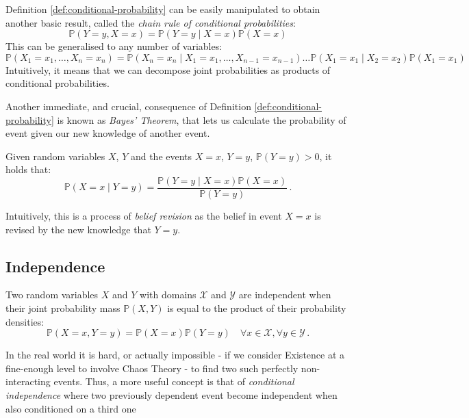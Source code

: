 Definition \ref{def:conditional-probability} can be easily manipulated to obtain another basic result, called the \textit{chain rule of conditional probabilities}:
\begin{equation} \label{eq:chainrule}
	\mathbb{P}(Y=y,X=x) = \mathbb{P}(Y=y \mid X=x) \mathbb{P}(X=x)
\end{equation}
This can be generalised to any number of variables:
\begin{equation} \label{eq:chainrule}
	\mathbb{P}(X_1=x_1, \ldots , X_n=x_n ) = \mathbb{P}(X_n=x_n \mid X_1=x_1, \ldots, X_{n-1}=x_{n-1}) \ldots \mathbb{P}(X_1=x_1 \mid X_2=x_2 ) \mathbb{P}(X_1=x_1) 
\end{equation}
Intuitively, it means that we can decompose joint probabilities as products of conditional probabilities.  

Another immediate, and crucial, consequence of Definition \ref{def:conditional-probability} is known as \textit{Bayes' Theorem}, that lets us calculate the probability of event given our new knowledge of another event.
\begin{theorem} \label{th:bayes-theorem}
	Given random variables $X$, $Y$ and the events $X=x$, $Y=y$, $\mathbb{P}(Y=y) > 0$, it holds that:
	\begin{equation*}
		\mathbb{P}(X=x \mid Y=y)=\frac{\mathbb{P}(Y=y \mid X=x) \mathbb{P}(X=x)}{\mathbb{P}(Y=y)} \,.
	\end{equation*}
\end{theorem}
Intuitively, this is a process of \textit{belief revision} as the belief in event $X=x$ is revised by the new knowledge that $Y=y$. 

\subsection{Independence} \label{subsec:independence}
\begin{definition}
	Two random variables $X$ and $Y$ with domains $\mathcal{X}$ and $\mathcal{Y}$ are independent when their joint probability mass $\mathbb{P}(X,Y)$ is equal to the product of their probability densities:
	\begin{equation*}
		\mathbb{P}(X=x,Y=y) =  \mathbb{P}(X=x) \mathbb{P}(Y=y) \quad \forall x \in \mathcal{X}, \forall y \in \mathcal{Y} \,.
	\end{equation*}
\end{definition}
In the real world it is hard, or actually impossible - if we consider Existence at a fine-enough level to involve Chaos Theory - to find two such perfectly non-interacting events.
Thus, a more useful concept is that of \textit{conditional independence} where two previously dependent event become independent when also conditioned on a third one

